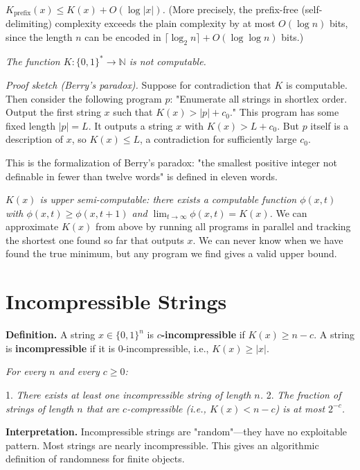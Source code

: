 \begin{proposition}
\textit{$K_{\text{prefix}}(x) \leq K(x) + O(\log |x|)$.} (More precisely, the prefix-free (self-delimiting) complexity exceeds the plain complexity by at most $O(\log n)$ bits, since the length $n$ can be encoded in $\lceil \log_2 n \rceil + O(\log \log n)$ bits.)
\end{proposition}

\begin{theorem}
\textit{The function $K : \{ 0,1\}^* \to \mathbb{N}$ is not computable.}

\textit{Proof sketch (Berry's paradox).} Suppose for contradiction that $K$ is computable. Then consider the following program $p$: "Enumerate all strings in shortlex order. Output the first string $x$ such that $K(x) > |p| + c_0$." This program has some fixed length $|p| = L$. It outputs a string $x$ with $K(x) > L + c_0$. But $p$ itself is a description of $x$, so $K(x) \leq L$, a contradiction for sufficiently large $c_0$.

This is the formalization of Berry's paradox: "the smallest positive integer not definable in fewer than twelve words" is defined in eleven words.
\end{theorem}

\begin{proposition}
\textit{$K(x)$ is upper semi-computable: there exists a computable function $\phi(x, t)$ with $\phi(x, t) \geq \phi(x, t+1)$ and $\lim_{t \to \infty} \phi(x, t) = K(x)$.} We can approximate $K(x)$ from above by running all programs in parallel and tracking the shortest one found so far that outputs $x$. We can never know when we have found the true minimum, but any program we find gives a valid upper bound.
\end{proposition}



\section{Incompressible Strings}

\textbf{Definition.} A string $x \in \{ 0,1\} ^n$ is \textbf{$c$-incompressible} if $K(x) \geq n - c$. A string is \textbf{incompressible} if it is $0$-incompressible, i.e., $K(x) \geq |x|$.

\begin{theorem}
\textit{For every $n$ and every $c \geq 0$:}

1. \textit{There exists at least one incompressible string of length $n$.}
2. \textit{The fraction of strings of length $n$ that are $c$-compressible (i.e., $K(x) < n - c$) is at most $2^{-c}$.}


\textbf{Interpretation.} Incompressible strings are "random"—they have no exploitable pattern. Most strings are nearly incompressible. This gives an algorithmic definition of randomness for finite objects.



\end{theorem}

